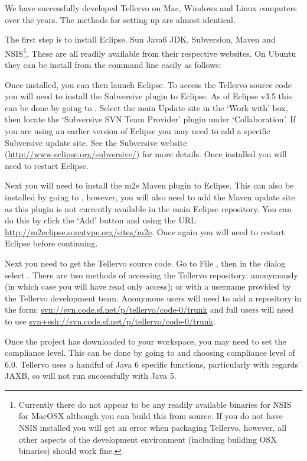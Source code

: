 We have successfully developed Tellervo on Mac, Windows and Linux computers over the years.  The methods for setting up are almost identical.  

The first step is to install Eclipse, Sun Java6 JDK, Subversion, Maven and NSIS\footnote{Currently there do not appear to be any readily available binaries for NSIS for MacOSX although you can build this from source.  If you do not have NSIS installed you will get an error when packaging Tellervo, however, all other aspects of the development environment (including building OSX binaries) should work fine.}.  These are all readily available from their respective websites.  On Ubuntu they can be install from the command line easily as follows:


Once installed, you can then launch Eclipse.  To access the Tellervo source code you will need to install the Subversive plugin to Eclipse.  As of Eclipse v3.5 this can be done by going to .  Select the main Update site in the `Work with' box, then locate the `Subversive SVN Team Provider' plugin under `Collaboration'.  If you are using an earlier version of Eclipse you may need to add a specific Subversive update site.  See the Subversive website (\url{http://www.eclipse.org/subversive/}) for more details.  Once installed you will need to restart Eclipse.

Next you will need to install the m2e Maven plugin to Eclipse.  This can also be installed by going to , however, you will also need to add the Maven update site as this plugin is not currently available in the main Eclipse repository.  You can do this by click the `Add' button and using the URL \url{http://m2eclipse.sonatype.org/sites/m2e}.  Once again you will need to restart Eclipse before continuing.

Next you need to get the Tellervo source code.  Go to File , then in the dialog select .  There are two methods of accessing the Tellervo repository: anonymously (in which case you will have read only access); or with a username provided by the Tellervo development team.  Anonymous users will need to add a repository in the form: \url{svn://svn.code.sf.net/p/tellervo/code-0/trunk} and full users will need to use \url{svn+ssh://svn.code.sf.net/p/tellervo/code-0/trunk}.

Once the project has downloaded to your workspace, you may need to set the compliance level.  This can be done by going to  and choosing compliance level of 6.0.  Tellervo uses a handful of Java 6 specific functions, particularly with regards JAXB, so will not run successfully with Java 5.  


